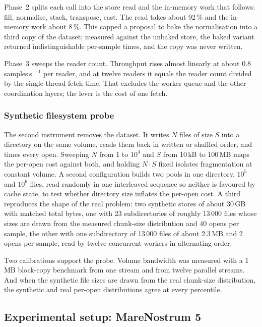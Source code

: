 \documentclass[gmd, manuscript]{copernicus}
\begin{document}
Phase~2 splits each call into the store read and the in-memory work that follows: fill,
normalise, stack, transpose, cast. The read takes about 92\,\% and the in-memory work about
8\,\%. This capped a proposal to bake the normalisation into a third copy of the dataset;
measured against the unbaked store, the baked variant returned indistinguishable per-sample
times, and the copy was never written.

Phase~3 sweeps the reader count. Throughput rises almost linearly at about 0.8 samples\,s
$^{-1}$ per reader, and at twelve readers it equals the reader count divided by the
single-thread fetch time. That excludes the worker queue and the other coordination layers;
the lever is the cost of one fetch.

\subsubsection{Synthetic filesystem probe}
\label{sec:probe}

The second instrument removes the dataset. It writes $N$ files of size $S$ into a directory on
the same volume, reads them back in written or shuffled order, and times every open. Sweeping
$N$ from 1 to $10^4$ and $S$ from 10\,kB to 100\,MB maps the per-open cost against both, and
holding $N \cdot S$ fixed isolates fragmentation at constant volume. A second configuration
builds two pools in one directory, $10^5$ and $10^6$ files, read randomly in one interleaved
sequence so neither is favoured by cache state, to test whether directory size inflates the
per-open cost. A third reproduces the shape of the real problem: two synthetic stores of about
30\,GB with matched total bytes, one with 23 subdirectories of roughly 13\,000 files whose
sizes are drawn from the measured chunk-size distribution and 40 opens per sample, the other
with one subdirectory of 13\,000 files of about 2.3\,MB and 2 opens per sample, read by twelve
concurrent workers in alternating order.

Two calibrations support the probe. Volume bandwidth was measured with a 1\,MB block-copy
benchmark from one stream and from twelve parallel streams. And when the synthetic file sizes
are drawn from the real chunk-size distribution, the synthetic and real per-open distributions
agree at every percentile.

\subsection{Experimental setup: MareNostrum 5}
\label{sec:setup}
\end{document}
